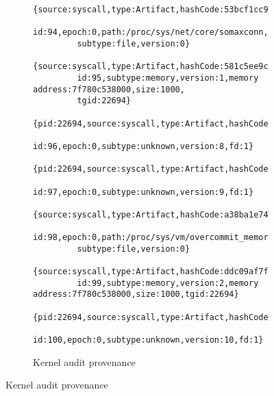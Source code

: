 \begin{figure}[t]

  \begin{subfigure}[b]{\columnwidth}
    {
      \scriptsize
      \begin{Verbatim}[gobble=8]
        {source:syscall,type:Artifact,hashCode:53bcf1cc966af740e6947b0e9c2a339b,
         id:94,epoch:0,path:/proc/sys/net/core/somaxconn,permissions:0644,
         subtype:file,version:0}
        {source:syscall,type:Artifact,hashCode:581c5ee9cdcf7389575329bf82952436,
         id:95,subtype:memory,version:1,memory address:7f780c538000,size:1000,
         tgid:22694}
        {pid:22694,source:syscall,type:Artifact,hashCode:aacd358e7170deccc70c2f88b52d4cef,
         id:96,epoch:0,subtype:unknown,version:8,fd:1}
        {pid:22694,source:syscall,type:Artifact,hashCode:c86147ac594fd4f80b476a6a928aaf56,
         id:97,epoch:0,subtype:unknown,version:9,fd:1}
        {source:syscall,type:Artifact,hashCode:a38ba1e7456b3e55852c279196a27603,
         id:98,epoch:0,path:/proc/sys/vm/overcommit_memory,permissions:0644,
         subtype:file,version:0}
        {source:syscall,type:Artifact,hashCode:ddc09af7f5ee63ea5d27b62bce4f92e7,
         id:99,subtype:memory,version:2,memory address:7f780c538000,size:1000,tgid:22694}
        {pid:22694,source:syscall,type:Artifact,hashCode:55e22f988b6b65f2114cdaa4e944480d,
         id:100,epoch:0,subtype:unknown,version:10,fd:1}
      \end{Verbatim}
    }
    \caption{Kernel audit provenance}
  \end{subfigure}


\end{figure}
